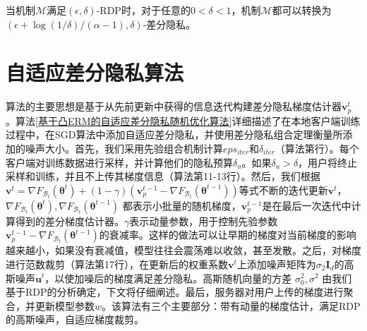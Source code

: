 \begin{theorem}\label{RDP向DP的转换}
当机制$\mathcal{M}$满足$(\epsilon, \delta)$-RDP时，对于任意的$0<\delta<1$，机制$\mathcal{M}$都可以转换为$(\epsilon+\log (1 / \delta) /(\alpha-1), \delta)$-差分隐私。
\end{theorem}

\section{自适应差分隐私算法}
算法的主要思想是基于从先前更新中获得的信息迭代构建差分隐私梯度估计器$\mathbf{v}_{p}^{t}$。算法\ref{基于凸ERM的自适应差分隐私随机优化算法}详细描述了在本地客户端训练过程中，在SGD算法中添加自适应差分隐私，并使用差分隐私组合定理衡量所添加的噪声大小。首先，我们采用先验组合机制计算$eps_{iter}$和$\delta_{iter}$（算法第行）。每个客户端对训练数据进行采样，并计算他们的隐私预算$\delta_{u}$。如果$\delta_{u}>\delta$，用户将终止采样和训练，并且不上传其梯度信息（算法第11-13行）。然后，我们根据$\mathbf{v}^{t}=\nabla F_{\mathcal{B}_{t}}\left(\boldsymbol{\theta}^{t}\right)+(1-\gamma)\left(\mathbf{v}_{p}^{t-1}-\nabla F_{\mathcal{B}_{t}}\left(\boldsymbol{\theta}^{t-1}\right)\right)$等式不断的迭代更新$\mathbf{v}^{t}$，$\nabla F_{\mathcal{B}_{t}}\left(\boldsymbol{\theta}^{t}\right), \nabla F_{\mathcal{B}_{t}}\left(\boldsymbol{\theta}^{t-1}\right)$ 都表示小批量的随机梯度，$\mathbf{v}_{p}^{t-1}$是在最后一次迭代中计算得到的差分梯度估计器。$\gamma$表示动量参数，用于控制先验参数$\mathbf{v}_{p}^{t-1}-\nabla F_{\mathcal{B}_{t}}\left(\boldsymbol{\theta}^{t-1}\right)$的衰减率。这样的做法可以让早期的梯度对当前梯度的影响越来越小，如果没有衰减值，模型往往会震荡难以收敛，甚至发散。之后，对梯度进行范数裁剪（算法第17行），在更新后的权重系数$\mathbf{v}^{t}$上添加噪声矩阵为$\sigma_{2} \mathbf{I}_{d}$的高斯噪声$\mathbf{u}^{t}$，以使加噪后的梯度满足差分隐私。高斯随机向量的方差 $\sigma_{0}^{2}, \sigma^{2}$ 由我们基于RDP的分析确定，下文将仔细阐述。最后，服务器对用户上传的梯度进行聚合，并更新模型参数$w$。该算法有三个主要部分：带有动量的梯度估计，满足RDP的高斯噪声，自适应梯度裁剪。

